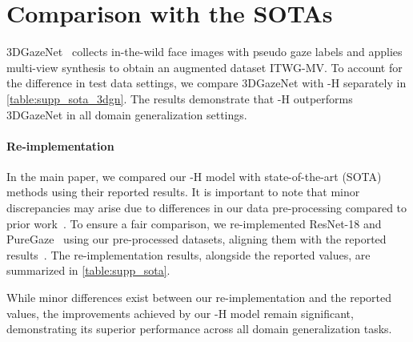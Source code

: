 \section{Comparison with the SOTAs}
3DGazeNet~\cite{ververas20253dgazenet} collects in-the-wild face images with pseudo gaze labels and applies multi-view synthesis to obtain an augmented dataset ITWG-MV.
To account for the difference in test data settings, we compare 3DGazeNet with \methodname-H separately in \cref{table:supp_sota_3dgn}.
The results demonstrate that \methodname-H outperforms 3DGazeNet in all domain generalization settings.

\paragraph{Re-implementation}
In the main paper, we compared our \methodname-H model with state-of-the-art (SOTA) methods using their reported results. 
It is important to note that minor discrepancies may arise due to differences in our data pre-processing compared to prior work~\cite{cheng2022puregaze,xu2023learning,zhao2024improving}. 
To ensure a fair comparison, we re-implemented ResNet-18 and PureGaze~\cite{cheng2022puregaze} using our pre-processed datasets, aligning them with the reported results~\cite{cheng2022puregaze,zhao2024improving}. 
The re-implementation results, alongside the reported values, are summarized in \cref{table:supp_sota}.

While minor differences exist between our re-implementation and the reported values, the improvements achieved by our \methodname-H model remain significant, demonstrating its superior performance across all domain generalization tasks. 



\begin{table}[t]
\begin{center}
\end{center}
\caption{
    Domain generalization compared with SOTA methods. 
    The results marked with $^{\dagger}$ are directly cited from previous studies~\cite{ververas20253dgazenet}.
}
\label{table:supp_sota_3dgn}
\end{table}


